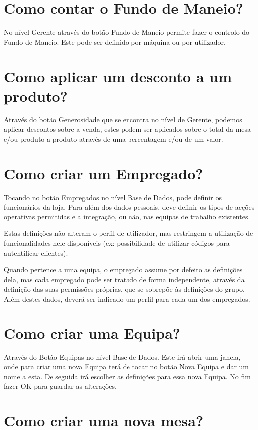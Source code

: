 \documentclass[a4paper,11pt,openany]{memoir}
\begin{document}
\section{Como contar o Fundo de Maneio?}
No nível Gerente através do botão Fundo de Maneio permite fazer o controlo do
Fundo de Maneio. Este pode ser definido por máquina ou por utilizador.

\section{Como aplicar um desconto a um produto?}
Através do botão Generosidade que se encontra no nível de Gerente, podemos
aplicar descontos sobre a venda, estes podem ser aplicados sobre o total da mesa
e/ou produto a produto através de uma percentagem e/ou de um valor.

\section{Como criar um Empregado?}
Tocando no botão Empregados no nível Base de Dados, pode definir os funcionários
da loja. Para além dos dados pessoais, deve definir os tipos de acções operativas
permitidas e a integração, ou não, nas equipas de trabalho existentes.

Estas definições não alteram o perfil de utilizador, mas restringem a utilização de
funcionalidades nele disponíveis (ex: possibilidade de utilizar códigos para autentificar
clientes).

Quando pertence a uma equipa, o empregado assume por defeito as
definições dela, mas cada empregado pode ser tratado de forma independente,
através da definição das suas permissões próprias, que se sobrepõe às definições
do grupo. Além destes dados, deverá ser indicado um perfil para cada um dos
empregados.

\section{Como criar uma Equipa?}
Através do Botão Equipas no nível Base de Dados. Este irá abrir uma janela, onde
para criar uma nova Equipa terá de tocar no botão Nova Equipa e dar um nome a
esta. De seguida irá escolher as definições para essa nova Equipa. No fim fazer OK
para guardar as alterações.

\section{Como criar uma nova mesa?}
\end{document}
